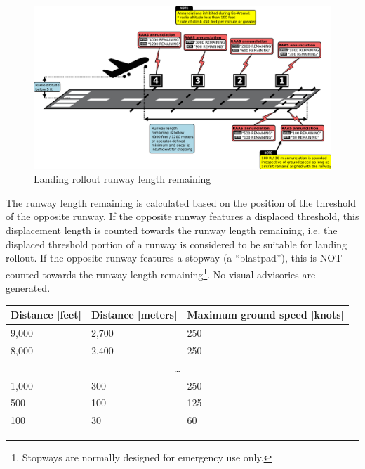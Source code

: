 \documentclass[a4paper,12pt]{article}
\begin{document}
\begin{figure}[H]
\begin{center}
\includegraphics[width=\textwidth]{../src/land_rollout.pdf}
\end{center}
\caption{Landing rollout runway length remaining}
\end{figure}

\noindent The runway length remaining is calculated based on the position
of the threshold of the opposite runway. If the opposite runway features
a displaced threshold, this displacement length is counted towards the
runway length remaining, i.e. the displaced threshold portion of a runway
is considered to be suitable for landing rollout. If the opposite runway
features a stopway (a ``blastpad''), this is NOT counted towards the
runway length remaining\footnote{Stopways are normally designed for
emergency use only.}.  No visual advisories are generated.

\begin{center}
\begin{tabular}[c]{|l|l|l|}
\hline

\rowcolor{tablehdrcolor}

\textbf{Distance [feet]} & \textbf{Distance [meters]} &
\textbf{Maximum ground speed [knots]} \\

\hline

9,000 & 2,700 & 250 \\

\hline

8,000 & 2,400 & 250 \\

\hline

\multicolumn{3}{|c|}{\ldots} \\

\hline

1,000 & 300 & 250 \\

\hline

500 & 100 & 125 \\

\hline

100 & 30 & 60 \\

\hline

\end{tabular}
\end{center}
\end{document}
